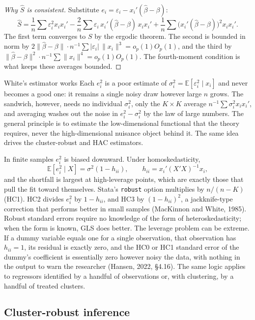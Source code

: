\documentclass[11pt,a4paper]{article}
\newcommand{\E}{\mathbb{E}}
\newcommand{\bh}{\hat\beta}
\newcommand{\op}{o_p}
\newcommand{\Op}{O_p}
\begin{document}
\begin{proof}[Why $\hat S$ is consistent]
Substitute $e_i=\varepsilon_i-x_i'(\bh-\beta)$:
\[
\hat S=\frac1n\sum\varepsilon_i^2x_ix_i'-\frac2n\sum\varepsilon_i\,x_i'(\bh-\beta)\,x_ix_i'+\frac1n\sum\big(x_i'(\bh-\beta)\big)^2x_ix_i'.
\]
The first term converges to $S$ by the ergodic theorem. The second is bounded in norm by $2\|\bh-\beta\|\cdot n^{-1}\sum|\varepsilon_i|\,\|x_i\|^3=\op(1)\Op(1)$, and the third by $\|\bh-\beta\|^2\cdot n^{-1}\sum\|x_i\|^4=\op(1)\Op(1)$. The fourth-moment condition is what keeps these averages bounded.
\end{proof}

\begin{whybox}{White's estimator works}
Each $e_i^2$ is a poor estimate of $\sigma_i^2=\E[\varepsilon_i^2\mid x_i]$ and never becomes a good one: it remains a single noisy draw however large $n$ grows. The sandwich, however, needs no individual $\sigma_i^2$, only the $K\times K$ average $n^{-1}\sum\sigma_i^2x_ix_i'$, and averaging washes out the noise in $e_i^2-\sigma_i^2$ by the law of large numbers. The general principle is to estimate the low-dimensional functional that the theory requires, never the high-dimensional nuisance object behind it. The same idea drives the cluster-robust and HAC estimators.
\end{whybox}

In finite samples $e_i^2$ is biased downward. Under homoskedasticity,
\[
\E[e_i^2\mid X]=\sigma^2(1-h_{ii}),\qquad h_{ii}=x_i'(X'X)^{-1}x_i,
\]
and the shortfall is largest at high-leverage points, which are exactly those that pull the fit toward themselves. Stata's \texttt{robust} option multiplies by $n/(n-K)$ (HC1). HC2 divides $e_i^2$ by $1-h_{ii}$, and HC3 by $(1-h_{ii})^2$, a jackknife-type correction that performs better in small samples (MacKinnon and White, 1985). Robust standard errors require no knowledge of the form of heteroskedasticity; when the form is known, GLS does better. The leverage problem can be extreme. If a dummy variable equals one for a single observation, that observation has $h_{ii}=1$, its residual is exactly zero, and the HC0 or HC1 standard error of the dummy's coefficient is essentially zero however noisy the data, with nothing in the output to warn the researcher (Hansen, 2022, \S4.16). The same logic applies to regressors identified by a handful of observations or, with clustering, by a handful of treated clusters.

\subsection{Cluster-robust inference}
\end{document}
